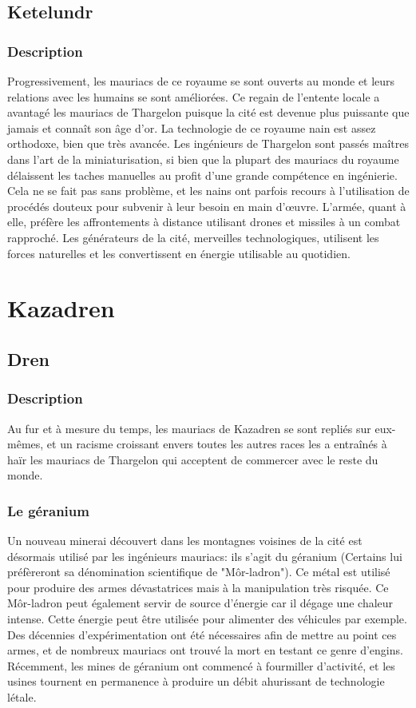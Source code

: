 \subsection{Ketelundr}
\subsubsection{Description}
Progressivement, les mauriacs de ce royaume se sont ouverts au monde et leurs relations avec les humains se sont améliorées. Ce regain de l'entente locale a avantagé les mauriacs de Thargelon puisque la cité est devenue plus puissante que jamais et connaît son âge d'or.
\newline
La technologie de ce royaume nain est assez orthodoxe, bien que très avancée. Les ingénieurs de Thargelon sont passés maîtres dans l'art de la miniaturisation, si bien que la plupart des mauriacs du royaume délaissent les taches manuelles au profit d'une grande compétence en ingénierie. Cela ne se fait pas sans problème, et les nains ont parfois recours à l'utilisation de procédés douteux pour subvenir à leur besoin en main d’œuvre. L'armée, quant à elle, préfère les affrontements à distance utilisant drones et missiles à un combat rapproché. Les générateurs de la cité, merveilles technologiques, utilisent les forces naturelles et les convertissent en énergie utilisable au quotidien.
\section{Kazadren}
\subsection{Dren}
\subsubsection{Description}
Au fur et à mesure du temps, les mauriacs de Kazadren se sont repliés sur eux-mêmes, et un racisme croissant envers toutes les autres races les a entraînés à haïr les mauriacs de Thargelon qui acceptent de commercer avec le reste du monde.
\subsubsection{Le géranium}
Un nouveau minerai découvert dans les montagnes voisines de la cité est désormais utilisé par les ingénieurs mauriacs: ils s'agit du géranium (Certains lui préfèreront sa dénomination scientifique de "Môr-ladron"). Ce métal est utilisé pour produire des armes dévastatrices mais à la manipulation très risquée. Ce Môr-ladron peut également servir de source d'énergie car il dégage une chaleur intense. Cette énergie peut être utilisée pour alimenter des véhicules par exemple. Des décennies d'expérimentation ont été nécessaires afin de mettre au point ces armes, et de nombreux mauriacs ont trouvé la mort en testant ce genre d'engins. Récemment, les mines de géranium ont commencé à fourmiller d'activité, et les usines tournent en permanence à produire un débit ahurissant de technologie létale.
